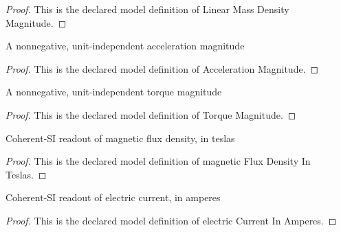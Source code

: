 \begin{proof}
  This is the declared model definition of Linear Mass Density Magnitude.
\end{proof}
\begin{definition}
  \label{def:physics:phyx-mini-0948:phyxminiproblems-problemphyxmini0948-accelerationmagnitude}
  A nonnegative, unit-independent acceleration magnitude
\end{definition}
\begin{proof}
  This is the declared model definition of Acceleration Magnitude.
\end{proof}
\begin{definition}
  \label{def:physics:phyx-mini-0948:phyxminiproblems-problemphyxmini0948-torquemagnitude}
  A nonnegative, unit-independent torque magnitude
\end{definition}
\begin{proof}
  This is the declared model definition of Torque Magnitude.
\end{proof}
\begin{definition}
  \label{def:physics:phyx-mini-0948:phyxminiproblems-problemphyxmini0948-magneticfluxdensityinteslas}
  Coherent-SI readout of magnetic flux density, in teslas
\end{definition}
\begin{proof}
  This is the declared model definition of magnetic Flux Density In Teslas.
\end{proof}
\begin{definition}
  \label{def:physics:phyx-mini-0948:phyxminiproblems-problemphyxmini0948-electriccurrentinamperes}
  Coherent-SI readout of electric current, in amperes
\end{definition}
\begin{proof}
  This is the declared model definition of electric Current In Amperes.
\end{proof}
